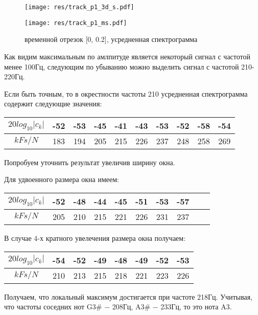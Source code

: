 \documentclass[oneside, final, 14pt]{extarticle}
\begin{document}
  \begin{figure}[t]
    \begin{multicols}{2}
      \hfill
      \texttt{[image: res/track\_p1\_3d\_s.pdf]}
      \hfill
      \caption{временной отрезок [0, 0.2], 3D спектрограмма }
      \label{pic_p1_3d}
      \hfill
      \texttt{[image: res/track\_p1\_ms.pdf]}
      \hfill
      \caption{временной отрезок [0, 0.2], усредненная спектрограмма }
      \label{pic_p1_ms}
    \end{multicols}
  \end{figure}

  Как видим максимальным по амлпитуде является некоторый сигнал с частотой менее
  100Гц, следующим по убыванию можно выделить сигнал с частотой 210-220Гц.

  Если быть точным, то в окрестности частоты 210 усредненная спектрограмма содержит
  следующие значения:

  \begin{tabular}[t]{|c|c|c|c|c|c|c|c|c|c|}
    \hline
    $20 log_{10}|c_k|$ & -52 & -53 & -45 & -41 & -43 & -53 & -52 & -58 & -54 \\
    \hline
    $k Fs/N$ & 183 & 194 & 205 & 215 & 226 & 237 & 248 & 258 & 269 \\
    \hline
  \end{tabular}

  Попробуем уточнить результат увеличив ширину окна.

  Для удвоенного размера окна имеем:

  \begin{tabular}[t]{|c|c|c|c|c|c|c|c|c|c|}
    \hline
    $20 log_{10}|c_k|$ & -52 & -48 & -44 & -45 & -51 & -53 & -57 \\
    \hline
    $k Fs/N$ & 205 & 210 & 215 & 221 & 226 & 231 & 237 \\
    \hline
  \end{tabular}

  В случае 4-х кратного увелечения размера окна получаем:

  \begin{tabular}[t]{|c|c|c|c|c|c|c|c|}
    \hline
    $20 log_{10}|c_k|$ & -54 & -52 & -49 & -48 & -49 & -52 & -53 \\
    \hline
    $k Fs/N$ & 210 & 213 & 215 & 218 & 221 & 223 & 226 \\
    \hline
  \end{tabular}


  Получаем, что локальный максимум достигается при частоте 218Гц. Учитывая,
  что частоты соседних нот G3\# $-$ 208Гц, A3\# $-$ 233Гц, то это нота A3.
\end{document}
